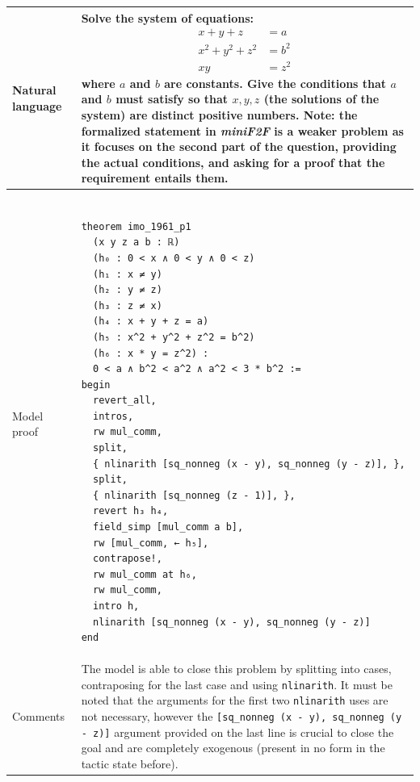 \documentclass[nohyperref]{article}
\theoremstyle{plain}
\theoremstyle{definition}
\theoremstyle{remark}
\begin{document}
\begin{table}[h]
\begin{small}
\begin{tabular}{|p{3.5cm}|p{12.5cm}|} 
  \hline 
  Natural language & 
  \begin{minipage}{12.5 cm}
    \vspace{0.5em}
    Solve the system of equations:
    {\begin{align*} 
      x + y + z  &= a \\
      x^2 +y^2+z^2 &=b^2 \\
      xy &= z^2
    \end{align*}}
    where $a$ and $b$ are constants. Give the conditions that $a$ and $b$ must satisfy so that $x, y, z$ (the solutions of the system) are distinct positive numbers. \textbf{Note}: the formalized statement in \textit{miniF2F} is a weaker problem as it focuses on the second part of the question, providing the actual conditions, and asking for a proof that the requirement entails them.
  \end{minipage} \\
  \hline 
  \centering Model proof & 
  \begin{minipage}{12.5 cm}
    \begin{verbatim} 
  
theorem imo_1961_p1
  (x y z a b : ℝ)
  (h₀ : 0 < x ∧ 0 < y ∧ 0 < z)
  (h₁ : x ≠ y)
  (h₂ : y ≠ z)
  (h₃ : z ≠ x)
  (h₄ : x + y + z = a)
  (h₅ : x^2 + y^2 + z^2 = b^2)
  (h₆ : x * y = z^2) :
  0 < a ∧ b^2 < a^2 ∧ a^2 < 3 * b^2 :=
begin
  revert_all,
  intros,
  rw mul_comm,
  split,
  { nlinarith [sq_nonneg (x - y), sq_nonneg (y - z)], },
  split,
  { nlinarith [sq_nonneg (z - 1)], },
  revert h₃ h₄,
  field_simp [mul_comm a b],
  rw [mul_comm, ← h₅],
  contrapose!,
  rw mul_comm at h₆,
  rw mul_comm,
  intro h,
  nlinarith [sq_nonneg (x - y), sq_nonneg (y - z)] 
end
    \end{verbatim} 
  \end{minipage}\\
  \hline 
  \centering Comments & The model is able to close this problem by splitting into cases, contraposing for the last case and using \texttt{nlinarith}. It must be noted that the arguments for the first two \texttt{nlinarith} uses are not necessary, however the \texttt{[sq\_nonneg (x - y), sq\_nonneg (y - z)]} argument provided on the last line is crucial to close the goal and are completely exogenous (present in no form in the tactic state before). \\
  \hline
\end{tabular}
\end{small}
\end{table}
\end{document}
